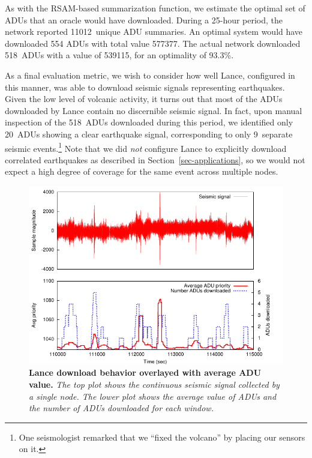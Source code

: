 
As with the RSAM-based summarization function, we estimate the optimal set of
ADUs that an oracle would have downloaded. During a 25-hour period, the
network reported 11012~unique ADU summaries. An optimal system would have
downloaded 554 ADUs with total value 577377.  The actual network
downloaded 518~ADUs with a value of 539115, for an optimality of 93.3\%. 


As a final evaluation metric, we wish to consider how well Lance,
configured in this manner, was able to download seismic signals
representing earthquakes. Given the low level of volcanic activity, 
it turns out that most of the ADUs downloaded by Lance contain no 
discernible seismic signal. In fact, upon manual inspection of the
518~ADUs downloaded during this period, we identified only 20~ADUs
showing a clear earthquake signal, corresponding to only 9~separate
seismic events.\footnote{One seismologist remarked that we 
``fixed the volcano'' by placing our sensors on it.}
Note that we did {\em not} configure Lance to explicitly download 
correlated earthquakes as described in Section~\ref{sec-applications},
so we would not expect a high degree of coverage for the same event
across multiple nodes.

\begin{figure}[t]
\begin{center}
\includegraphics[width=1.0\hsize]{./figs/deploy/deploydownloads/everything.pdf}
\end{center}
\caption{\small {\bf Lance download behavior overlayed with average
ADU value.} {\em The top plot shows the continuous seismic signal
collected by a single node. The lower plot shows the average value
of ADUs and the number of ADUs downloaded for each window.}}
\label{fig-downloads-cont}
\end{figure}

